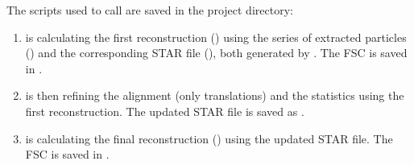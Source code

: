 The scripts used to call {\cisTEM} are saved in the project directory:
\begin{enumerate}
    \item {} is calculating the first reconstruction () using the series of extracted particles () and the corresponding STAR file (), both generated by {\emClarity}. The FSC is saved in .
    
    \item {} is then refining the alignment (only translations) and the statistics using the first reconstruction. The updated STAR file is saved as .
    
    \item {} is calculating the final reconstruction () using the updated STAR file. The FSC is saved in .
\end{enumerate}
